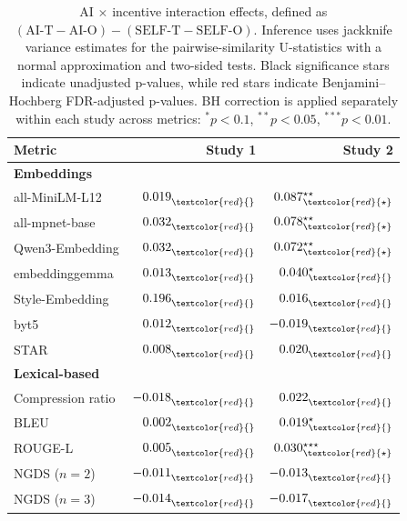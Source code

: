 \begin{table}[ht]
\centering
\small
\begin{tabular}{lrr}
\toprule
Metric &
\textbf{Study 1} &
\textbf{Study 2} \\
\midrule
\rowcolor{lightgray}
\textbf{Embeddings} & & \\
all-MiniLM-L12 & $0.019^{}_{\textcolor{red}{}}$ & $0.087^{\star \star}_{\textcolor{red}{\star}}$ \\
all-mpnet-base & $0.032^{}_{\textcolor{red}{}}$ & $0.078^{\star \star}_{\textcolor{red}{\star}}$ \\
Qwen3-Embedding & $0.032^{}_{\textcolor{red}{}}$ & $0.072^{\star \star}_{\textcolor{red}{\star}}$ \\
embeddinggemma & $0.013^{}_{\textcolor{red}{}}$ & $0.040^{\star}_{\textcolor{red}{}}$ \\
Style-Embedding & $0.196^{}_{\textcolor{red}{}}$ & $0.016^{}_{\textcolor{red}{}}$ \\
byt5 & $0.012^{}_{\textcolor{red}{}}$ & $-0.019^{}_{\textcolor{red}{}}$ \\
STAR & $0.008^{}_{\textcolor{red}{}}$ & $0.020^{}_{\textcolor{red}{}}$ \\
\midrule
\rowcolor{lightgray}
\textbf{Lexical-based} & & \\
Compression ratio & $-0.018^{}_{\textcolor{red}{}}$ & $0.022^{}_{\textcolor{red}{}}$ \\
BLEU & $0.002^{}_{\textcolor{red}{}}$ & $0.019^{\star}_{\textcolor{red}{}}$ \\
ROUGE-L & $0.005^{}_{\textcolor{red}{}}$ & $0.030^{\star \star \star}_{\textcolor{red}{\star}}$ \\
NGDS ($n=2$) & $-0.011^{}_{\textcolor{red}{}}$ & $-0.013^{}_{\textcolor{red}{}}$ \\
NGDS ($n=3$) & $-0.014^{}_{\textcolor{red}{}}$ & $-0.017^{}_{\textcolor{red}{}}$ \\
\bottomrule
\end{tabular}
\caption{
AI $\times$ incentive interaction effects, defined as
$(\mathrm{AI\text{-}T}-\mathrm{AI\text{-}O})
-(\mathrm{SELF\text{-}T}-\mathrm{SELF\text{-}O})$.
Inference uses jackknife variance estimates for the pairwise-similarity
U-statistics with a normal approximation and two-sided tests.
Black significance stars indicate unadjusted p-values, while red stars
indicate Benjamini--Hochberg FDR-adjusted p-values. BH correction is
applied separately within each study across metrics:
$^{*}p<0.1$, $^{**}p<0.05$, $^{***}p<0.01$.
}
\label{tab:interaction}
\end{table}
